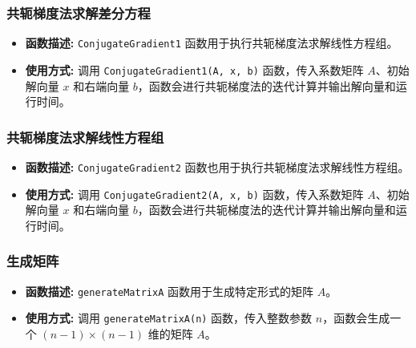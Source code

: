 \documentclass{article}
\begin{document}
\subsubsection*{共轭梯度法求解差分方程}
\begin{itemize}
	\item \textbf{函数描述:} \texttt{ConjugateGradient1} 函数用于执行共轭梯度法求解线性方程组。
	\item \textbf{使用方式:} 调用 \texttt{ConjugateGradient1(A, x, b)} 函数，传入系数矩阵 $A$、初始解向量 $x$ 和右端向量 $b$，函数会进行共轭梯度法的迭代计算并输出解向量和运行时间。
\end{itemize}

\subsubsection*{共轭梯度法求解线性方程组}
\begin{itemize}
	\item \textbf{函数描述:} \texttt{ConjugateGradient2} 函数也用于执行共轭梯度法求解线性方程组。
	\item \textbf{使用方式:} 调用 \texttt{ConjugateGradient2(A, x, b)} 函数，传入系数矩阵 $A$、初始解向量 $x$ 和右端向量 $b$，函数会进行共轭梯度法的迭代计算并输出解向量和运行时间。
\end{itemize}

\subsubsection*{生成矩阵}
\begin{itemize}
	\item \textbf{函数描述:} \texttt{generateMatrixA} 函数用于生成特定形式的矩阵 $A$。
	\item \textbf{使用方式:} 调用 \texttt{generateMatrixA(n)} 函数，传入整数参数 $n$，函数会生成一个 $(n-1) \times (n-1)$ 维的矩阵 $A$。
\end{itemize}
\end{document}
